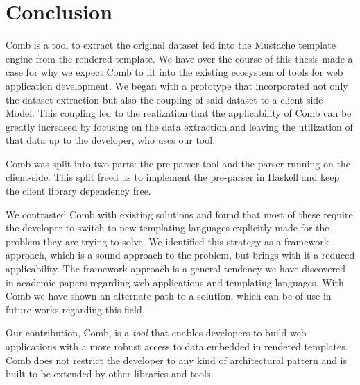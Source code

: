 \documentclass[thesis.tex]{subfiles}
\begin{document}
\chapter{Conclusion}
\label{chap:conclusion}
Comb is a tool to extract the original dataset fed into the Mustache template
engine from the rendered template. We have over the course of this thesis made a
case for why we expect Comb to fit into the existing ecosystem of tools for web
application development. We began with a prototype that incorporated not only
the dataset extraction but also the coupling of said dataset to a client-side
Model.
This coupling led to the realization that the applicability of Comb can be
greatly increased by focusing on the data extraction and leaving the utilization
of that data up to the developer, who uses our tool.

Comb was split into two parts: the pre-parser tool and the parser running on
the client-side. This split freed us to implement the pre-parser in Haskell
and keep the client library dependency free.

We contrasted Comb with existing solutions and found that most of these require
the developer to switch to new templating languages explicitly made for the
problem they are trying to solve. We identified this strategy as a framework
approach, which is a sound approach to the problem, but brings with it a reduced
applicability. The framework approach is a general tendency we have discovered
in academic papers regarding web applications and templating languages. With
Comb we have shown an alternate path to a solution, which can be of use in
future works regarding this field.

Our contribution, Comb, is a \emph{tool} that enables developers to
build web applications with a more robust access to data embedded in rendered
templates. Comb does not restrict the developer to any kind of architectural
pattern and is built to be extended by other libraries and tools.

\end{document}
